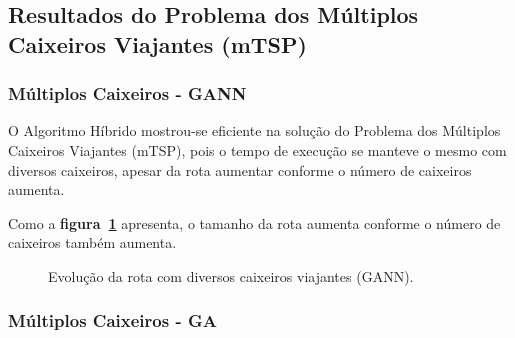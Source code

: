 \documentclass[12pt,openright,a4paper,oneside]{tcc}
\begin{document}
		\subsection{Resultados do Problema dos Múltiplos Caixeiros Viajantes (mTSP)}	

		\subsubsection{Múltiplos Caixeiros - GANN}
		
		O Algoritmo Híbrido mostrou-se eficiente na solução do Problema dos Múltiplos Caixeiros Viajantes (mTSP), pois o tempo de execução se manteve o mesmo com diversos caixeiros, apesar da rota aumentar conforme o número de caixeiros aumenta.

		Como a \textbf{figura~\ref{figmult}} apresenta, o tamanho da rota aumenta conforme o número de caixeiros também aumenta. 

		\begin{figure}[h]
			\centering
            \caption{Evolução da rota com diversos caixeiros viajantes (GANN).}
			\label{figmult}
		\end{figure}

		\subsubsection{Múltiplos Caixeiros - GA}
\end{document}
